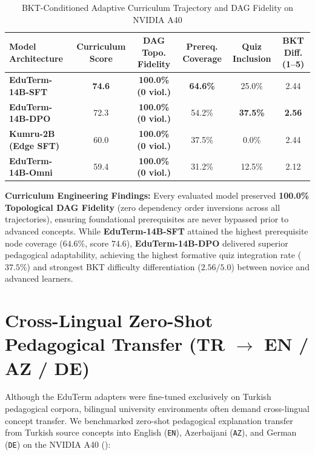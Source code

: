 \documentclass[a4paper,12pt]{report}
\begin{document}
\begin{table}[htbp]
\centering
\small
\caption{BKT-Conditioned Adaptive Curriculum Trajectory and DAG Fidelity on NVIDIA A40}
\label{tab:adaptive_curriculum_bkt}
\scriptsize\setlength{\tabcolsep}{1.5pt}
\begin{tabularx}{\textwidth}{>{\RaggedRight\arraybackslash}Xccccc}
\hline
\textbf{Model Architecture} & \textbf{Curriculum Score} & \textbf{DAG Topo. Fidelity} & \textbf{Prereq. Coverage} & \textbf{Quiz Inclusion} & \textbf{BKT Diff. (1--5)} \\
\hline
\textbf{EduTerm-14B-SFT} & \textbf{74.6} & \textbf{100.0\% (0 viol.)} & \textbf{64.6\%} & 25.0\% & 2.44 \\
\textbf{EduTerm-14B-DPO} & 72.3 & \textbf{100.0\% (0 viol.)} & 54.2\% & \textbf{37.5\%} & \textbf{2.56} \\
\textbf{Kumru-2B (Edge SFT)} & 60.0 & \textbf{100.0\% (0 viol.)} & 37.5\% & 0.0\% & 2.44 \\
\textbf{EduTerm-14B-Omni} & 59.4 & \textbf{100.0\% (0 viol.)} & 31.2\% & 12.5\% & 2.12 \\
\hline
\end{tabularx}
\end{table}

\textbf{Curriculum Engineering Findings:} Every evaluated model preserved \textbf{100.0\% Topological DAG Fidelity} (zero dependency order inversions across all trajectories), ensuring foundational prerequisites are never bypassed prior to advanced concepts. While \textbf{EduTerm-14B-SFT} attained the highest prerequisite node coverage ($64.6\%$, score $74.6$), \textbf{EduTerm-14B-DPO} delivered superior pedagogical adaptability, achieving the highest formative quiz integration rate ($37.5\%$) and strongest BKT difficulty differentiation ($2.56 / 5.0$) between novice and advanced learners.

\section{Cross-Lingual Zero-Shot Pedagogical Transfer (TR \texorpdfstring{$\to$}{->} EN / AZ / DE)}
\label{sec:cross_lingual_transfer}
Although the EduTerm adapters were fine-tuned exclusively on Turkish pedagogical corpora, bilingual university environments often demand cross-lingual concept transfer. We benchmarked zero-shot pedagogical explanation transfer from Turkish source concepts into English (\texttt{EN}), Azerbaijani (\texttt{AZ}), and German (\texttt{DE}) on the NVIDIA A40 ():
\end{document}
